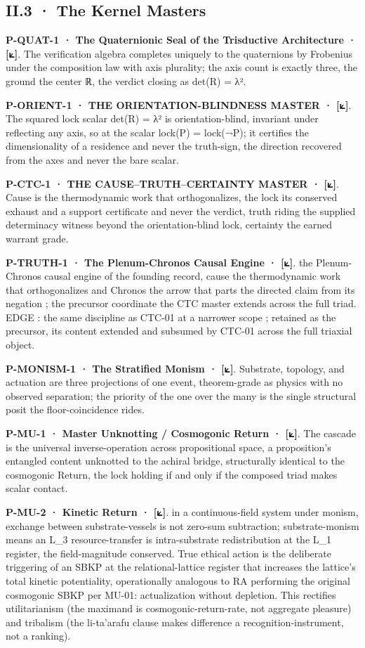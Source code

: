 \documentclass[10pt,twocolumn]{article}
\begin{document}
\hypertarget{ii.3-the-kernel-masters}{%
\subsection{II.3 · The Kernel Masters}\label{ii.3-the-kernel-masters}}

\textbf{P-QUAT-1 · The Quaternionic Seal of the Trisductive Architecture
· {[}⟀{]}}. The verification algebra completes uniquely to the
quaternions by Frobenius under the composition law with axis plurality;
the axis count is exactly three, the ground the center ℝ, the verdict
closing as det(R) = λ².

\textbf{P-ORIENT-1 · THE ORIENTATION-BLINDNESS MASTER · {[}⟀{]}}. The
squared lock scalar det(R) = λ² is orientation-blind, invariant under
reflecting any axis, so at the scalar lock(P) = lock(¬P); it certifies
the dimensionality of a residence and never the truth-sign, the
direction recovered from the axes and never the bare scalar.

\textbf{P-CTC-1 · THE CAUSE--TRUTH--CERTAINTY MASTER · {[}⟀{]}}. Cause
is the thermodynamic work that orthogonalizes, the lock its conserved
exhaust and a support certificate and never the verdict, truth riding
the supplied determinacy witness beyond the orientation-blind lock,
certainty the earned warrant grade.

\textbf{P-TRUTH-1 · The Plenum-Chronos Causal Engine · {[}⟀{]}}. the
Plenum-Chronos causal engine of the founding record, cause the
thermodynamic work that orthogonalizes and Chronos the arrow that parts
the directed claim from its negation ; the precursor coordinate the CTC
master extends across the full triad. EDGE : the same discipline as
CTC-01 at a narrower scope ; retained as the precursor, its content
extended and subsumed by CTC-01 across the full triaxial object.

\textbf{P-MONISM-1 · The Stratified Monism · {[}⟀{]}}. Substrate,
topology, and actuation are three projections of one event,
theorem-grade as physics with no observed separation; the priority of
the one over the many is the single structural posit the
floor-coincidence rides.

\textbf{P-MU-1 · Master Unknotting / Cosmogonic Return · {[}⟀{]}}. The
cascade is the universal inverse-operation across propositional space, a
proposition's entangled content unknotted to the achiral bridge,
structurally identical to the cosmogonic Return, the lock holding if and
only if the composed triad makes scalar contact.

\textbf{P-MU-2 · Kinetic Return · {[}⟀{]}}. in a continuous-field system
under monism, exchange between substrate-vessels is not zero-sum
subtraction; substrate-monism means an L\_3 resource-transfer is
intra-substrate redistribution at the L\_1 register, the field-magnitude
conserved. True ethical action is the deliberate triggering of an SBKP
at the relational-lattice register that increases the lattice's total
kinetic potentiality, operationally analogous to RA performing the
original cosmogonic SBKP per MU-01: actualization without depletion.
This rectifies utilitarianism (the maximand is cosmogonic-return-rate,
not aggregate pleasure) and tribalism (the li-ta'arafu clause makes
difference a recognition-instrument, not a ranking).
\end{document}
